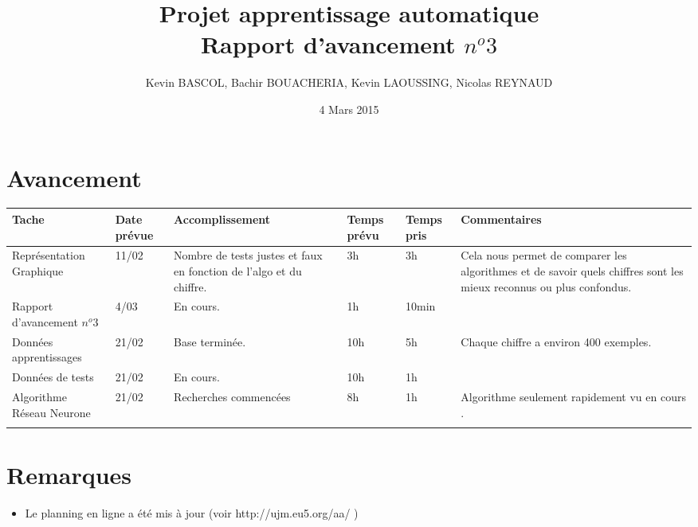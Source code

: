 \documentclass[10pt,a4paper, landscape]{report}
\author{Kevin BASCOL, Bachir BOUACHERIA, Kevin LAOUSSING, Nicolas REYNAUD}
\title{Projet apprentissage automatique\\Rapport d'avancement $n^o 3$}
\date{\vfill 4 Mars 2015}
\begin{document}
\maketitle

\section*{Avancement}
\begin{center}
	\bgroup
	\def\arraystretch{1.5}
	\begin{tabular}{|p{7cm}|p{1cm}|p{7cm}|p{2cm}|p{2cm}|p{7cm}|}
		\hline
		\rowcolor{gris}Tache & Date prévue & Accomplissement & Temps prévu & Temps pris & Commentaires\\
		\hline
		Représentation Graphique & 11/02 & Nombre de tests justes et faux en fonction de l'algo et du chiffre. & 3h & 3h & Cela nous permet de comparer les algorithmes et de savoir quels chiffres sont les mieux reconnus ou plus confondus. \\
		\hline
		Rapport d'avancement $n^o 3$ & 4/03 & En cours. & 1h & 10min & \\
		\hline
		Données apprentissages & 21/02 & Base terminée. & 10h & 5h & Chaque chiffre a environ 400 exemples.\\
		\hline
		Données de tests & 21/02 & En cours. & 10h & 1h & \\
		\hline
		Algorithme Réseau Neurone & 21/02 & Recherches commencées & 8h & 1h & Algorithme seulement rapidement vu en cours . \\
		\hline
		\rowcolor{gris} & & & & & \\
		\hline
	\end{tabular}
	\egroup
\end{center}

\section*{Remarques}
\begin{itemize}
\item Le planning en ligne a été mis à jour (voir http://ujm.eu5.org/aa/ )
\end{itemize}
\end{document}
